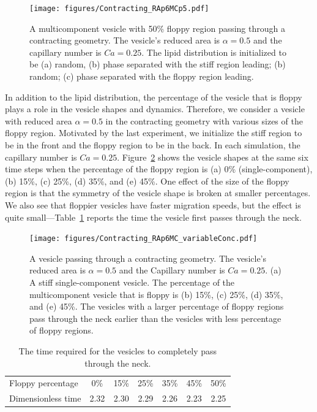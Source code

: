 \documentclass[twoside,twocolumn,9pt]{article}
\begin{document}
\begin{figure}[h]
  \centering
  \texttt{[image: figures/Contracting\_RAp6MCp5.pdf]}
  \caption{\label{fig:RA6leftRightRand} \small A multicomponent vesicle
  with 50\% floppy region passing through a contracting geometry. The
  vesicle's reduced area is $\alpha = 0.5$ and the capillary number is
  $Ca = 0.25$. The lipid distribution is initialized to be (a) random,
  (b) phase separated with the stiff region leading; (b) random; (c)
  phase separated with the floppy region leading.}
\end{figure}

In addition to the lipid distribution, the percentage of the vesicle
that is floppy plays a role in the vesicle shapes and dynamics.
Therefore, we consider a vesicle with reduced area $\alpha = 0.5$ in the
contracting geometry with various sizes of the floppy region. Motivated
by the last experiment, we initialize the stiff region to be in the
front and the floppy region to be in the back. In each simulation, the
capillary number is $Ca = 0.25$. Figure~\ref{fig:RA5} shows the vesicle
shapes at the same six time steps when the percentage of the floppy
region is (a) 0\% (single-component), (b) 15\%, (c) 25\%, (d) 35\%, and
(e) 45\%. One effect of the size of the floppy region is that the
symmetry of the vesicle shape is broken at smaller percentages. We also
see that floppier vesicles have faster migration speeds, but the effect
is quite small---Table~\ref{tbl:contractingTimes} reports the time the
vesicle first passes through the neck. 

\begin{figure}[h]
  \centering
  \texttt{[image: figures/Contracting\_RAp6MC\_variableConc.pdf]}
  \caption{\label{fig:RA5} \small A vesicle passing through a
  contracting geometry. The vesicle's reduced area is $\alpha = 0.5$ and
  the Capillary number is $Ca = 0.25$. (a) A stiff single-component
  vesicle. The percentage of the multicomponent vesicle that is floppy
  is (b) 15\%, (c) 25\%, (d) 35\%, and (e) 45\%. The vesicles with a
  larger percentage of floppy regions pass through the neck earlier than
  the vesicles with less percentage of floppy regions.}
\end{figure}

\begin{table}[h]
  \centering
  \begin{tabular}{l|cccccc}
    \hline
    Floppy percentage & 0\% & 15\% & 25\% & 35\% & 45\% & 50\% \\ 
    Dimensionless time & 2.32 & 2.30 & 2.29 & 2.26 & 2.23 & 2.25\\
    \hline
  \end{tabular}
  \caption{\label{tbl:contractingTimes} \small The time required for the
  vesicles to completely pass through the neck.}
\end{table}
\end{document}
